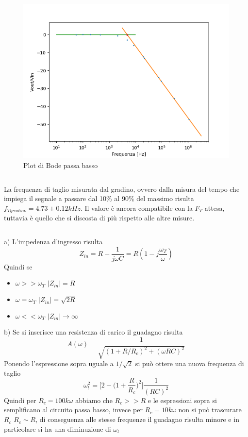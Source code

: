 \documentclass[10pt,a4paper]{article}
\begin{document}
\begin{figure}
	\centering
	\includegraphics[scale=0.7]{a.png} 
	\caption{Plot di Bode passa basso}
\end{figure}
\subsection{}
La frequenza di taglio misurata dal gradino, ovvero dalla misura del tempo che impiega il segnale a passare dal 10\% al 90\% del massimo risulta $f_{Tgradino}=4.73\pm0.12kHz$. Il valore è ancora compatibile con la $F_T$ attesa, tuttavia è quello che si discosta di più rispetto alle altre misure.
\subsection{}
a) L'impedenza d'ingresso risulta
\begin{equation}
	Z_{in} = R+\frac{1}{j \omega C} = R(1-j\frac{\omega_T}{\omega})
\end{equation}
Quindi se
\begin{itemize}
\item $\omega>>\omega_T$ $|Z_{in}|=R$
\item $\omega=\omega_T$ $|Z_{in}|=\sqrt{2R}$
\item $\omega<<\omega_T$ $|Z_{in}|\rightarrow \infty$
\end{itemize}
b)
Se si inserisce una resistenza di carico il guadagno risulta
\begin{equation}
	A(\omega)=\frac{1}{\sqrt{(1+R/R_c)^2+(\omega RC)^2}}
\end{equation}
Ponendo l'espressione sopra uguale a $1/\sqrt{2}$ si può ottere una nuova frequenza di taglio
\begin{equation}
	\omega_t^2=\bigg[2-\bigg(1+\frac{R}{R_c}\bigg)^2\bigg]\frac{1}{(RC)^2}
\end{equation}
Quindi per $R_c=100k \omega$ abbiamo che $R_c>>R$ e le espressioni sopra si semplificano al circuito passa basso, invece per $R_c=10k \omega$ non si può trascurare $R_c$ $R_c\sim R$, di conseguenza alle stesse frequenze il guadagno risulta minore e in particolare si ha una diminuzione di $\omega_t$
\end{document}
